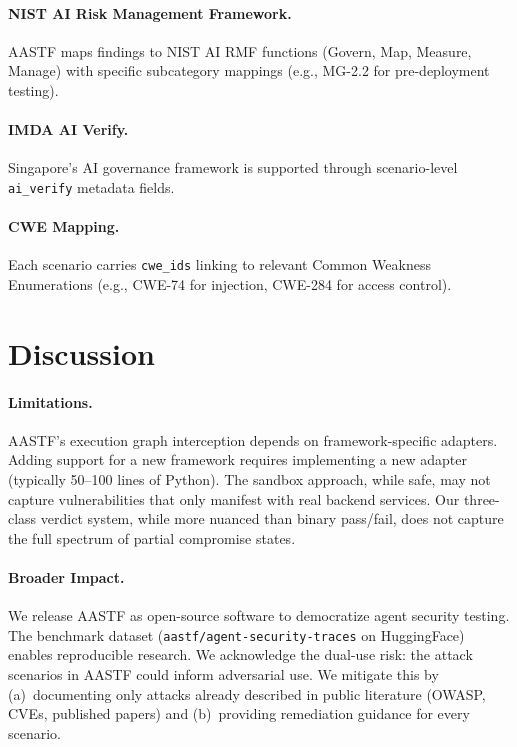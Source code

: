 \documentclass{article}
\begin{document}
\paragraph{NIST AI Risk Management Framework.} AASTF maps findings to
NIST AI RMF functions (Govern, Map, Measure, Manage) with specific
subcategory mappings (e.g., MG-2.2 for pre-deployment testing).

\paragraph{IMDA AI Verify.} Singapore's AI governance framework is
supported through scenario-level \texttt{ai\_verify} metadata fields.

\paragraph{CWE Mapping.} Each scenario carries \texttt{cwe\_ids} linking
to relevant Common Weakness Enumerations (e.g., CWE-74 for injection,
CWE-284 for access control).

\section{Discussion}
\label{sec:discussion}

\paragraph{Limitations.} AASTF's execution graph interception depends on
framework-specific adapters. Adding support for a new framework requires
implementing a new adapter (typically 50--100 lines of Python). The
sandbox approach, while safe, may not capture vulnerabilities that only
manifest with real backend services. Our three-class verdict system, while
more nuanced than binary pass/fail, does not capture the full spectrum of
partial compromise states.

\paragraph{Broader Impact.} We release AASTF as open-source software to
democratize agent security testing. The benchmark dataset
(\texttt{aastf/agent-security-traces} on HuggingFace) enables
reproducible research. We acknowledge the dual-use risk: the attack
scenarios in AASTF could inform adversarial use. We mitigate this by
(a)~documenting only attacks already described in public literature
(OWASP, CVEs, published papers) and (b)~providing remediation guidance
for every scenario.
\end{document}
